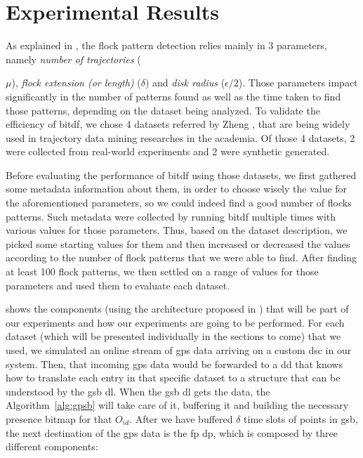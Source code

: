 \chapter{Experimental Results}
\label{chp:results}
As explained in , the flock pattern detection relies mainly in 3 parameters, namely
\textit{number of trajectories} ({$\mu$), \textit{flock extension (or length)} ($\delta$) and \textit{disk radius}
($\epsilon/2$). Those parameters impact significantly in the number of patterns found as well as the time taken to find
those patterns, depending on the dataset being analyzed. To validate the efficiency of \ac{bitdf}, we chose 4 datasets
referred by Zheng \citep{survey}, that are being widely used in trajectory data mining researches in the academia. Of
those 4 datasets, 2 were collected from real-world experiments and 2 were synthetic generated.

Before evaluating the performance of \ac{bitdf} using those datasets, we first gathered some metadata information about
them, in order to choose wisely the value for the aforementioned parameters, so we could indeed find a good number of
flocks patterns. Such metadata were collected by running \ac{bitdf} multiple times with various values for those
parameters. Thus, based on the dataset description, we picked some starting values for them and then increased or
decreased the values according to the number of flock patterns that we were able to find. After finding at least 100
flock patterns, we then settled on a range of values for those parameters and used them to evaluate each dataset.

 shows the components (using the architecture proposed in ) that
will be part of our experiments and how our experiments are going to be performed. For each dataset (which will be
presented individually in the sections to come) that we used, we simulated an online stream of \ac{gps} data arriving on
a custom \ac{dsc} in our system. Then, that incoming \ac{gps} data would be forwarded to a \ac{dd} that knows how to
translate each entry in that specific dataset to a structure that can be understood by the \ac{gsb} \ac{dl}. When
the \ac{gsb} \ac{dl} gets the data, the Algorithm~\ref{alg:gpsb} will take care of it, buffering it and building
the necessary presence bitmap for that $O_{id}$. After we have buffered $\delta$ time slots of points in \ac{gsb}, the
next destination of the \ac{gps} data is the \ac{fp} \ac{dp}, which is composed by three different components:

}
